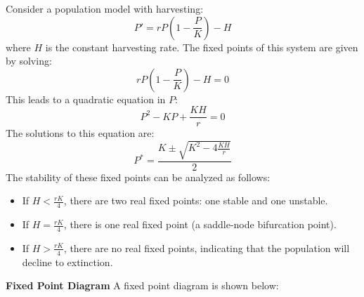 \documentclass[11pt]{article}
\begin{document}
\begin{example}
    Consider a population model with harvesting:
    $$
    P' = rP\left(1 - \frac{P}{K}\right) - H
    $$
    where \( H \) is the constant harvesting rate. The fixed points of this system are given by solving:
    $$
    rP\left(1 - \frac{P}{K}\right) - H = 0
    $$
    This leads to a quadratic equation in \( P \):
    $$
    P^2 - KP + \frac{KH}{r} = 0
    $$
    The solutions to this equation are:
    $$
    P^* = \frac{K \pm \sqrt{K^2 - 4\frac{KH}{r}}}{2}
    $$
    The stability of these fixed points can be analyzed as follows:
    \begin{itemize}
        \item If \( H < \frac{rK}{4} \), there are two real fixed points: one stable and one unstable.
        \item If \( H = \frac{rK}{4} \), there is one real fixed point (a saddle-node bifurcation point).
        \item If \( H > \frac{rK}{4} \), there are no real fixed points, indicating that the population will decline to extinction.
    \end{itemize}
    \textbf{Fixed Point Diagram} A fixed point diagram is shown below:
        \begin{figure}[h!]
            \centering
\end{figure}
\end{example}
\end{document}
